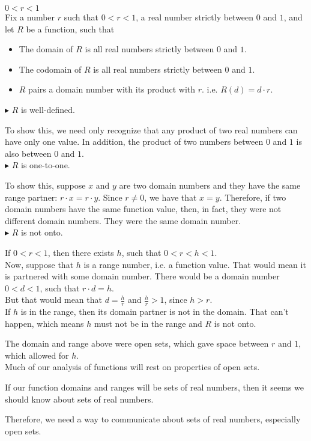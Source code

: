 \documentclass{ximera}
\begin{document}
\begin{example} $0 < r < 1$ \\
Fix a number $r$ such that $0 < r < 1$, a real number strictly between $0$ and $1$, and let $R$ be a function, such that

\begin{itemize}
\item The domain of $R$ is all real numbers strictly between $0$ and $1$.  \\ 
\item The codomain of $R$ is all real numbers strictly between $0$ and $1$.  \\
\item $R$ pairs a domain number with its product with $r$. i.e. $R(d) = d \cdot r$.
\end{itemize}





$\blacktriangleright$ $R$ is well-defined.  

To show this, we need only recognize that any product of two real numbers can have only one value.  In addition, the product of two numbers between $0$ and $1$ is also between $0$ and $1$.  \\


$\blacktriangleright$ $R$ is one-to-one. 

To show this, suppose $x$ and $y$ are two domain numbers and they have the same range partner: $r \cdot x = r \cdot y$.  Since $r \ne 0$, we have that $x = y$. Therefore, if two domain numbers have the same function value, then, in fact, they were not different domain numbers.  They were the same domain number. \\


$\blacktriangleright$ $R$ is not onto.

If $0 < r < 1$, then there exists $h$, such that $0 < r < h < 1$.  \\

Now, suppose that $h$ is a range number, i.e. a function value. That would mean it is partnered with some domain number.  There would be a domain number $0 < d < 1$, such that  $r \cdot d = h$.  \\


But that would mean that $d = \frac{h}{r}$ and $\frac{h}{r} > 1$, since $h > r$.  \\


If $h$ is in the range, then its domain partner is not in the domain.  That can't happen, which means $h$ must not be in the range and $R$ is not onto.





\end{example} 

The domain and range above were open sets, which gave space between $r$ and $1$, which allowed for $h$. \\

Much of our analysis of functions will rest on properties of open sets. \


If our function domains and ranges will be sets of real numbers, then it seems we should know about sets of real numbers.

Therefore, we need a way to communicate about sets of real numbers, especially open sets.
\end{document}
